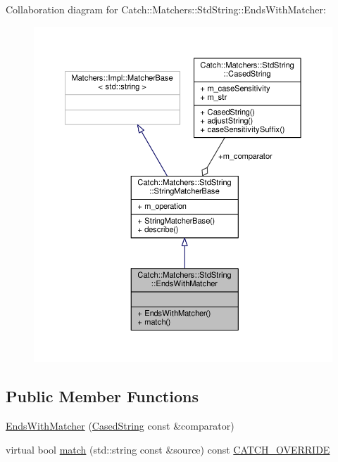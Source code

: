 Collaboration diagram for Catch\-:\-:Matchers\-:\-:Std\-String\-:\-:Ends\-With\-Matcher\-:
\nopagebreak
\begin{figure}[H]
\begin{center}
\leavevmode
\includegraphics[width=350pt]{struct_catch_1_1_matchers_1_1_std_string_1_1_ends_with_matcher__coll__graph}
\end{center}
\end{figure}
\subsection*{Public Member Functions}
\begin{DoxyCompactItemize}
\item 
\hyperlink{struct_catch_1_1_matchers_1_1_std_string_1_1_ends_with_matcher_aa5ec700b4629562f74f362080accfd7b}{Ends\-With\-Matcher} (\hyperlink{struct_catch_1_1_matchers_1_1_std_string_1_1_cased_string}{Cased\-String} const \&comparator)
\item 
virtual bool \hyperlink{struct_catch_1_1_matchers_1_1_std_string_1_1_ends_with_matcher_a21c6dc68e30716d5c718f4f8c3186af1}{match} (std\-::string const \&source) const \hyperlink{catch_8hpp_a8ecdce4d3f57835f707915ae831eb847}{C\-A\-T\-C\-H\-\_\-\-O\-V\-E\-R\-R\-I\-D\-E}
\end{DoxyCompactItemize}
